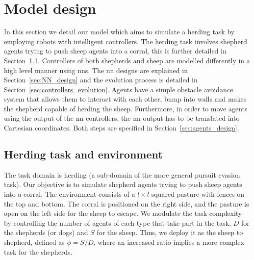 \documentclass[conference]{IEEEtran}
\begin{document}
\section{Model design}
\label{sec:model_design}
In this section we detail our model which aims to simulate a herding task by employing robots with intelligent controllers.
The herding task involves shepherd agents trying to push sheep agents into a corral, this is further detailed in Section~\ref{sec:herding_task_environment}.
Controllers of both shepherds and sheep are modelled differently in a high level manner using \glspl{nn}.
The \gls{nn} designs are explained in Section~\ref{sec:NN_design} and the evolution process is detailed in Section~\ref{sec:controllers_evolution}.
Agents have a simple obstacle avoidance system that allows them to interact with each other, bump into walls and makes the shepherd capable of herding the sheep.
Furthermore, in order to move agents using the output of the \gls{nn} controllers, the \gls{nn} output has to be translated into Cartesian coordinates.
Both steps are specified in Section~\ref{sec:agents_design}.

\subsection{Herding task and environment}
\label{sec:herding_task_environment}
The task domain is herding (a sub-domain of the more general pursuit evasion task).
Our objective is to simulate shepherd agents trying to push sheep agents into a corral. 
The environment consists of a $l \times l$ squared pasture with fences on the top and bottom.
The corral is positioned on the right side, and the pasture is open on the left side for the sheep to escape.
We modulate the task complexity by controlling the number of agents of each type that take part in the task, $D$ for the shepherds (or dogs) and $S$ for the sheep.
Thus, we deploy it as the sheep to shepherd, defined as $\phi = S / D$, where an increased ratio implies a more complex task for the shepherds.
\end{document}

